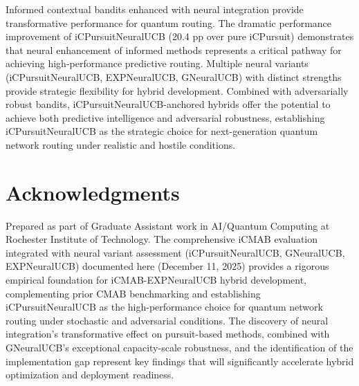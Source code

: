 \documentclass[12pt,a4paper]{article}
\begin{document}
Informed contextual bandits enhanced with neural integration provide transformative performance for quantum routing. The dramatic performance improvement of iCPursuitNeuralUCB (20.4 pp over pure iCPursuit) demonstrates that neural enhancement of informed methods represents a critical pathway for achieving high-performance predictive routing. Multiple neural variants (iCPursuitNeuralUCB, EXPNeuralUCB, GNeuralUCB) with distinct strengths provide strategic flexibility for hybrid development. Combined with adversarially robust bandits, iCPursuitNeuralUCB-anchored hybrids offer the potential to achieve both predictive intelligence and adversarial robustness, establishing iCPursuitNeuralUCB as the strategic choice for next-generation quantum network routing under realistic and hostile conditions.

\newpage
\section{Acknowledgments}

Prepared as part of Graduate Assistant work in AI/Quantum Computing at Rochester Institute of Technology. The comprehensive iCMAB evaluation integrated with neural variant assessment (iCPursuitNeuralUCB, GNeuralUCB, EXPNeuralUCB) documented here (December 11, 2025) provides a rigorous empirical foundation for iCMAB-EXPNeuralUCB hybrid development, complementing prior CMAB benchmarking and establishing iCPursuitNeuralUCB as the high-performance choice for quantum network routing under stochastic and adversarial conditions. The discovery of neural integration's transformative effect on pursuit-based methods, combined with GNeuralUCB's exceptional capacity-scale robustness, and the identification of the implementation gap represent key findings that will significantly accelerate hybrid optimization and deployment readiness.
\end{document}
